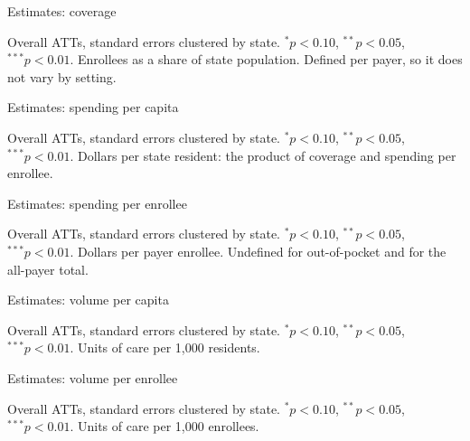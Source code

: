\documentclass[aspectratio=169,11pt]{beamer}
\begin{document}
\begin{frame}{Estimates: coverage}
  \vspace{0.35cm}
  \begin{center}
  \resizebox{\linewidth}{!}{}
  \end{center}
  \vspace{0.5cm}
  {\footnotesize\color{WarmGray} Overall ATTs, standard errors clustered by state. $^{*}p<0.10$, $^{**}p<0.05$, $^{***}p<0.01$. Enrollees as a share of state population. Defined per payer, so it does not vary by setting.}
\end{frame}
\begin{frame}{Estimates: spending per capita}
  \vspace{0.35cm}
  \begin{center}
  \resizebox{\linewidth}{!}{}
  \end{center}
  \vspace{0.5cm}
  {\footnotesize\color{WarmGray} Overall ATTs, standard errors clustered by state. $^{*}p<0.10$, $^{**}p<0.05$, $^{***}p<0.01$. Dollars per state resident: the product of coverage and spending per enrollee.}
\end{frame}
\begin{frame}{Estimates: spending per enrollee}
  \vspace{0.35cm}
  \begin{center}
  \resizebox{\linewidth}{!}{}
  \end{center}
  \vspace{0.5cm}
  {\footnotesize\color{WarmGray} Overall ATTs, standard errors clustered by state. $^{*}p<0.10$, $^{**}p<0.05$, $^{***}p<0.01$. Dollars per payer enrollee. Undefined for out-of-pocket and for the all-payer total.}
\end{frame}
\begin{frame}{Estimates: volume per capita}
  \vspace{0.35cm}
  \begin{center}
  \resizebox{\linewidth}{!}{}
  \end{center}
  \vspace{0.5cm}
  {\footnotesize\color{WarmGray} Overall ATTs, standard errors clustered by state. $^{*}p<0.10$, $^{**}p<0.05$, $^{***}p<0.01$. Units of care per 1,000 residents.}
\end{frame}
\begin{frame}{Estimates: volume per enrollee}
  \vspace{0.35cm}
  \begin{center}
  \resizebox{\linewidth}{!}{}
  \end{center}
  \vspace{0.5cm}
  {\footnotesize\color{WarmGray} Overall ATTs, standard errors clustered by state. $^{*}p<0.10$, $^{**}p<0.05$, $^{***}p<0.01$. Units of care per 1,000 enrollees.}
\end{frame}
\end{document}
